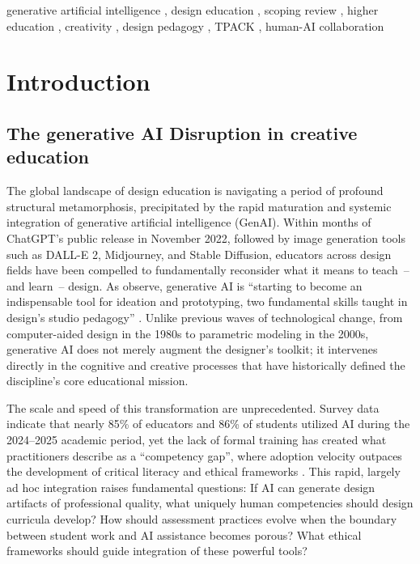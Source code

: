 \documentclass[ed]{acnsart}
\begin{document}
\begin{keywords}
generative artificial intelligence \sep
design education \sep
scoping review \sep
higher education \sep
creativity \sep
design pedagogy \sep
TPACK \sep
human-AI collaboration
\end{keywords}

\maketitle



\section{Introduction}

\subsection{The generative AI Disruption in creative education}

The global landscape of design education is navigating a period of profound structural metamorphosis, precipitated by the rapid maturation and systemic integration of generative artificial intelligence (GenAI). Within months of ChatGPT's public release in November 2022, followed by image generation tools such as DALL-E 2, Midjourney, and Stable Diffusion, educators across design fields have been compelled to fundamentally reconsider what it means to teach~-- and learn~-- design. As \citet{Fleischmann2024} observe, generative AI is ``starting to become an indispensable tool for ideation and prototyping, two fundamental skills taught in design's studio pedagogy'' \cite[p.~2]{Fleischmann2024}. Unlike previous waves of technological change, from computer-aided design in the 1980s to parametric modeling in the 2000s, generative AI does not merely augment the designer's toolkit; it intervenes directly in the cognitive and creative processes that have historically defined the discipline's core educational mission.

The scale and speed of this transformation are unprecedented. Survey data indicate that nearly 85\% of educators and 86\% of students utilized AI during the 2024--2025 academic period, yet the lack of formal training has created what practitioners describe as a ``competency gap'', where adoption velocity outpaces the development of critical literacy and ethical frameworks \cite{Pudasaini2025}. This rapid, largely ad hoc integration raises fundamental questions: If AI can generate design artifacts of professional quality, what uniquely human competencies should design curricula develop? How should assessment practices evolve when the boundary between student work and AI assistance becomes porous? What ethical frameworks should guide integration of these powerful tools?
\end{document}
